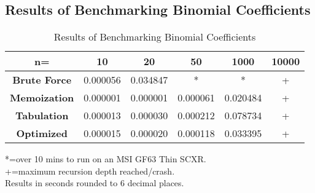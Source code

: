 \subsection{Results of Benchmarking Binomial Coefficients}
\begin{table}[H]
    \centering
    \begin{tabular}{|c|c|c|c|c|c|}
        \hline
        \textbf{n=}  & \textbf{10} & \textbf{20} & \textbf{50} & \textbf{1000} & \textbf{10000} \\
        \hline
        \textbf{Brute Force} & 0.000056 & 0.034847 & * & * & + \\
        \hline
        \textbf{Memoization} & 0.000001 & 0.000001 & 0.000061 & 0.020484 & + \\
        \hline
        \textbf{Tabulation} & 0.000013 & 0.000030 & 0.000212 & 0.078734 & + \\
        \hline
        \textbf{Optimized} & 0.000015 & 0.000020 & 0.000118 & 0.033395 & + \\
        \hline
    \end{tabular}
    \caption{Results of Benchmarking Binomial Coefficients}
\end{table}
*=over 10 mins to run on an MSI GF63 Thin SCXR.\\
+=maximum recursion depth reached/crash.\\
Results in seconds rounded to 6 decimal places.